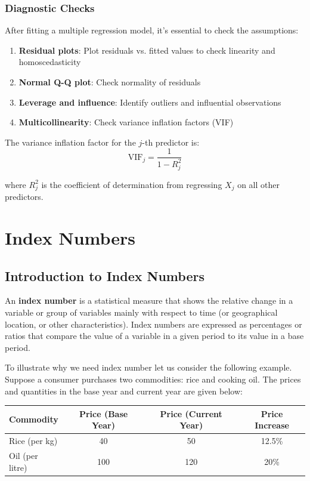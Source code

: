 \documentclass[twoside]{book}
\begin{document}
\subsection{Diagnostic Checks}

After fitting a multiple regression model, it's essential to check the assumptions:

\begin{enumerate}
    \item \textbf{Residual plots}: Plot residuals vs. fitted values to check linearity and homoscedasticity
    \item \textbf{Normal Q-Q plot}: Check normality of residuals
    \item \textbf{Leverage and influence}: Identify outliers and influential observations
    \item \textbf{Multicollinearity}: Check variance inflation factors (VIF)
\end{enumerate}

The variance inflation factor for the $j$-th predictor is:
\begin{equation}
\text{VIF}_j = \frac{1}{1-R_j^2}
\end{equation}

where $R_j^2$ is the coefficient of determination from regressing $X_j$ on all other predictors.


\chapter{Index Numbers}

\section{Introduction to Index Numbers}

An \textbf{index number} is a statistical measure that shows the relative change in a variable or group of variables mainly with respect to time (or geographical location, or other characteristics). Index numbers are expressed as percentages or ratios that compare the value of a variable in a given period to its value in a base period.

To illustrate why we need index number let us consider the following example. Suppose a consumer purchases two commodities: rice and cooking oil. The prices and quantities in the base year and current year are given below:

\begin{table}[H]
\centering
\begin{tabular}{l|c|c|c}
\toprule
\textbf{Commodity} & \textbf{Price (Base Year)} & \textbf{Price (Current Year)} & \textbf{Price Increase}\\
\midrule
Rice (per kg) & 40 & 50 & 12.5\%\\
Oil (per litre) & 100 & 120 & 20\%\\
\bottomrule
\end{tabular}
\end{table}
\end{document}
